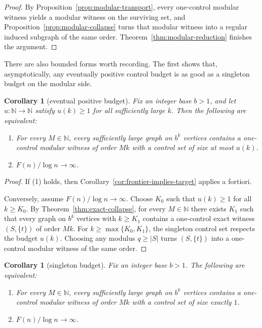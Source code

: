 \documentclass[11pt]{amsart}
\newtheorem{corollary}[theorem]{Corollary}
\theoremstyle{definition}
\newcommand{\N}{\mathbb{N}}
\begin{document}
\begin{proof}
By Proposition~\ref{prop:modular-transport}, every one-control modular witness yields a modular
witness on the surviving set, and Proposition~\ref{prop:modular-collapse} turns that modular
witness into a regular induced subgraph of the same order. Theorem~\ref{thm:modular-reduction}
finishes the argument.
\end{proof}

There are also bounded forms worth recording. The first shows that, asymptotically, any eventually
positive control budget is as good as a singleton budget on the modular side.

\begin{corollary}[eventual positive budget]\label{cor:positive-budget}
Fix an integer base $b>1$, and let $u \colon \N \to \N$ satisfy $u(k) \ge 1$ for all sufficiently
large $k$. Then the following are equivalent:
\begin{enumerate}
  \item For every $M \in \N$, every sufficiently large graph on $b^k$ vertices contains a
    one-control modular witness of order $Mk$ with a control set of size at most $u(k)$.
  \item $F(n)/\log n \to \infty$.
\end{enumerate}
\end{corollary}

\begin{proof}
If (1) holds, then Corollary~\ref{cor:frontier-implies-target} applies a fortiori.

Conversely, assume $F(n)/\log n \to \infty$. Choose $K_0$ such that $u(k) \ge 1$ for all
$k \ge K_0$. By Theorem~\ref{thm:exact-collapse}, for every $M \in \N$ there exists $K_1$ such that
every graph on $b^k$ vertices with $k \ge K_1$ contains a one-control exact witness
$(S,\{t\})$ of order $Mk$. For $k \ge \max\{K_0,K_1\}$, the singleton control set respects the
budget $u(k)$. Choosing any modulus $q \ge |S|$ turns $(S,\{t\})$ into a one-control modular
witness of the same order.
\end{proof}

\begin{corollary}[singleton budget]\label{cor:singleton-budget}
Fix an integer base $b>1$. The following are equivalent:
\begin{enumerate}
  \item For every $M \in \N$, every sufficiently large graph on $b^k$ vertices contains a
    one-control modular witness of order $Mk$ with a control set of size exactly $1$.
  \item $F(n)/\log n \to \infty$.
\end{enumerate}
\end{corollary}
\end{document}
